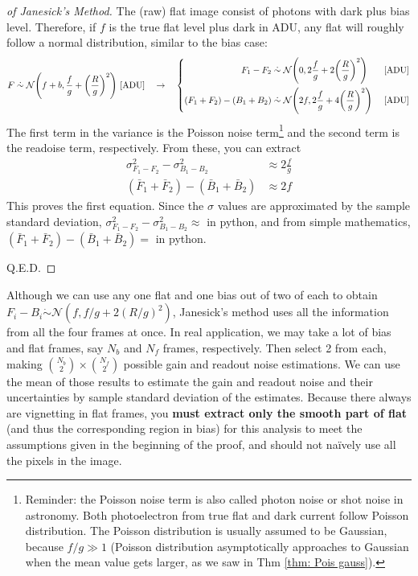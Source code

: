 \begin{proof}[of Janesick's Method]
The (raw) flat image consist of photons with dark plus bias level. Therefore, if $ f $ is the true flat level plus dark in ADU, any flat will roughly follow a normal distribution, similar to the bias case: 
\begin{equation*}
  F \mathrel{\dot{\sim}} \mathcal{N} \qty( f + b, \frac{f}{g} + \qty(\frac{R}{g})^2 ) ~\mathrm{[ADU]}
  \quad \rightarrow \quad  
  \left \{
  \begin{aligned}
    F_1 - F_2 &\mathrel{\dot{\sim}} 
      \mathcal{N} \qty( 0, 2\frac{f}{g} + 2 \qty(\frac{R}{g})^2 ) &~\mathrm{[ADU]}\\
    (F_1 + F_2) - (B_1 + B_2) & \mathrel{\dot{\sim}} 
      \mathcal{N} \qty(2f, 2 \frac{f}{g} + 4 \qty( \frac{R}{g} )^2) &~\mathrm{[ADU]}
  \end{aligned}
  \right .
\end{equation*}
The first term in the variance is the Poisson noise term\footnote{Reminder: the Poisson noise term is also called photon noise or shot noise in astronomy. Both photoelectron from true flat and dark current follow Poisson distribution. The Poisson distribution is usually assumed to be Gaussian, because $ f/g \gg 1 $ (Poisson distribution asymptotically approaches to Gaussian when the mean value gets larger, as we saw in Thm \ref{thm: Pois gauss}).} and the second term is the readoise term, respectively. From these, you can extract
\begin{align*}
  \sigma^2_{F_1 - F_2} - \sigma^2_{B_1 - B_2} 
    &\approx 2\frac{f}{g}\\
  (\bar{F}_1 + \bar{F}_2) - (\bar{B}_1 + \bar{B}_2)
   &\approx 2f
\end{align*}
This proves the first equation. Since the $ \sigma $ values are approximated by the sample standard deviation, $ \sigma^2_{F_1 - F_2} - \sigma^2_{B_1 - B_2} \approx $  in python, and from simple mathematics, $ (\bar{F}_1 + \bar{F}_2) - (\bar{B}_1 + \bar{B}_2) = $  in python.

Q.E.D.
\end{proof}

Although we can use any one flat and one bias out of two of each to obtain $ F_i - B_i \mathrel{\dot{\sim}} \mathcal{N} (f, f/g + 2(R/g)^2) $, Janesick's method uses all the information from all the four frames at once. In real application, we may take a lot of bias and flat frames, say $ N_b $ and $ N_f $ frames, respectively. Then select 2 from each, making $ \binom{N_b}{2} \times \binom{N_f}{2} $ possible gain and readout noise estimations. We can use the mean of those results to estimate the gain and readout noise and their uncertainties by sample standard deviation of the estimates. Because there always are vignetting in flat frames, you \textbf{must extract only the smooth part of flat} (and thus the corresponding region in bias) for this analysis to meet the assumptions given in the beginning of the proof, and should not na\"{i}vely use all the pixels in the image.

